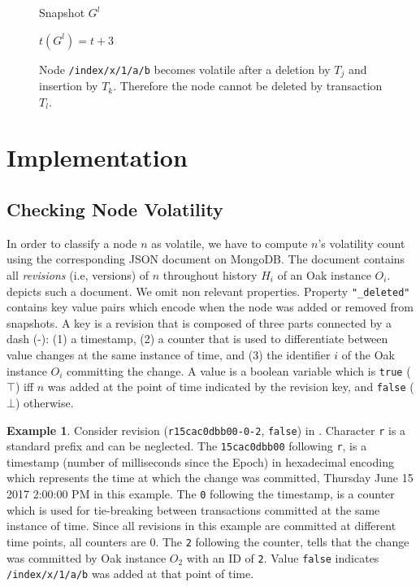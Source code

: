 \documentclass[abstracton,12pt]{scrartcl}
\theoremstyle{definition}
\newtheorem{example}{Example}
\begin{document}
\begin{figure}[h]
\begin{scriptsize}
\begin{multicols}{4}
\begin{center}
{                    \vspace{27mm}
                }

                Snapshot $G^l$

                $t(G^l) = t + 3$
            \end{center}
        \end{multicols}
    \end{scriptsize}
    \caption{Node \texttt{/index/x/1/a/b} becomes volatile after a deletion by $T_j$ and insertion by $T_k$. Therefore the node cannot be deleted by transaction $T_l$.}
    \label{fig:vol_example}
\end{figure}

\newpage
\section{Implementation}
\label{sec:implementation}

\subsection{Checking Node Volatility}

In order to classify a node $n$ as volatile, we have to compute $n$'s volatility count using the corresponding JSON document on MongoDB.
The document contains all \textit{revisions} (i.e, versions) of $n$ throughout history $H_i$ of an Oak instance $O_i$.
 depicts such a document.
We omit non relevant properties.
Property \texttt{"\_deleted"} contains key value pairs which encode when the node was added or removed from snapshots.
A key is a revision that is composed of three parts connected by a dash (-): (1) a timestamp, (2) a counter that is used to differentiate between value changes at the same instance of time, and (3) the identifier $i$ of the Oak instance $O_i$ committing the change.
A value is a boolean variable which is \texttt{true} ($\top$) iff $n$ was added at the point of time indicated by the revision key, and \texttt{false} ($\bot$) otherwise.
\begin{example}
    Consider revision (\texttt{r15cac0dbb00-0-2}, \texttt{false}) in .
    Character \texttt{r} is a standard prefix and can be neglected.
    The \texttt{15cac0dbb00} following \texttt{r}, is a timestamp (number of milliseconds since the Epoch) in hexadecimal encoding which represents the time at which the change was committed, Thursday June 15 2017 2:00:00 PM in this example.
    The \texttt{0} following the timestamp, is a counter which is used for tie-breaking between transactions committed at the same instance of time.
    Since all revisions in this example are committed at different time points, all counters are $0$.
    The \texttt{2} following the counter, tells that the change was committed by Oak instance $O_2$ with an ID of \texttt{2}.
    Value \texttt{false} indicates \texttt{/index/x/1/a/b} was added at that point of time.
\end{example}
\end{document}
